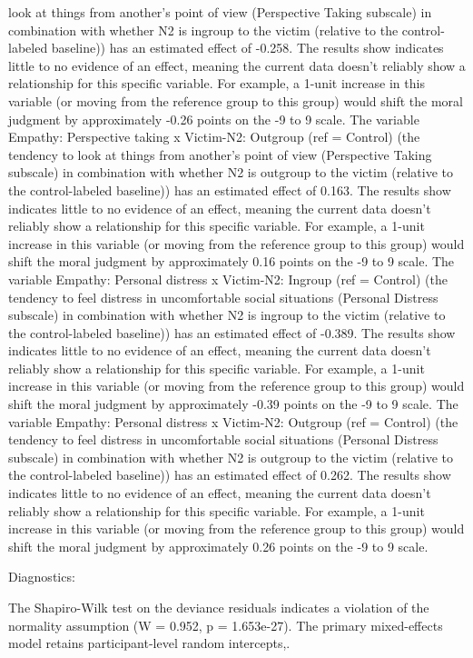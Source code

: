 \documentclass[11pt]{article}
\begin{document}
look at things from another's point of view (Perspective Taking subscale) in combination with whether N2 is ingroup to the victim (relative to the control-labeled baseline)) has an estimated effect of -0.258. The results show indicates little to no evidence of an effect, meaning the current data doesn't reliably show a relationship for this specific variable. For example, a 1-unit increase in this variable (or moving from the reference group to this group) would shift the moral judgment by approximately -0.26 points on the -9 to 9 scale. The variable Empathy: Perspective taking x Victim-N2: Outgroup (ref = Control) (the tendency to look at things from another's point of view (Perspective Taking subscale) in combination with whether N2 is outgroup to the victim (relative to the control-labeled baseline)) has an estimated effect of 0.163. The results show indicates little to no evidence of an effect, meaning the current data doesn't reliably show a relationship for this specific variable. For example, a 1-unit increase in this variable (or moving from the reference group to this group) would shift the moral judgment by approximately 0.16 points on the -9 to 9 scale. The variable Empathy: Personal distress x Victim-N2: Ingroup (ref = Control) (the tendency to feel distress in uncomfortable social situations (Personal Distress subscale) in combination with whether N2 is ingroup to the victim (relative to the control-labeled baseline)) has an estimated effect of -0.389. The results show indicates little to no evidence of an effect, meaning the current data doesn't reliably show a relationship for this specific variable. For example, a 1-unit increase in this variable (or moving from the reference group to this group) would shift the moral judgment by approximately -0.39 points on the -9 to 9 scale. The variable Empathy: Personal distress x Victim-N2: Outgroup (ref = Control) (the tendency to feel distress in uncomfortable social situations (Personal Distress subscale) in combination with whether N2 is outgroup to the victim (relative to the control-labeled baseline)) has an estimated effect of 0.262. The results show indicates little to no evidence of an effect, meaning the current data doesn't reliably show a relationship for this specific variable. For example, a 1-unit increase in this variable (or moving from the reference group to this group) would shift the moral judgment by approximately 0.26 points on the -9 to 9 scale.

Diagnostics:

The Shapiro-Wilk test on the deviance residuals indicates a violation of the normality assumption (W = 0.952, p = 1.653e-27). The primary mixed-effects model retains participant-level random intercepts,.
\end{document}
